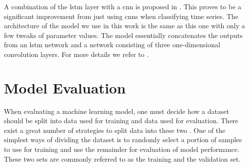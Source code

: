 A combination of the \gls{lstm} layer with a \gls{cnn} is proposed in \citep{karim_majumdar_darabi_chen_2018}. This proves to be a significant improvement from just using \gls{cnn}s when classifying time series. The architecture of the model we use in this work is the same as this one with only a few tweaks of parameter values. The model essentially concatenates the outputs from an \gls{lstm} network and a network consisting of three one-dimensional convolution layers. For more details we refer to \citep{karim_majumdar_darabi_chen_2018}.

\section{Model Evaluation}






When evaluating a machine learning model, one must decide how a dataset should be split into data used for training and data used for evaluation. There exist a great number of strategies to split data into these two \citep{raschka}. One of the simplest ways of dividing the dataset is to randomly select a portion of samples to use for training and use the remainder for evaluation of model performance. These two sets are commonly referred to as the training and the validation set.


